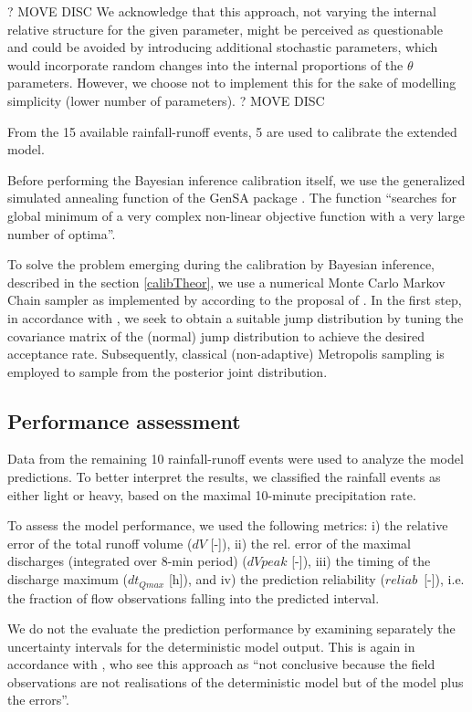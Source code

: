 \documentclass{ctuthesis}\usepackage[]{graphicx}\usepackage[]{color}
\begin{document}
? MOVE DISC
We acknowledge that this approach, not varying the internal relative structure for the given parameter, might be perceived as questionable and could be avoided by introducing additional stochastic parameters, which would incorporate random changes into the internal proportions  of the $\theta$ parameters. However, we choose not to implement this for the sake of modelling simplicity (lower number of parameters).
? MOVE DISC

From the 15 available rainfall-runoff events, 5 are used to calibrate the extended model.

Before performing the  Bayesian inference calibration itself, we use the generalized simulated annealing function of the \textsf{GenSA} package \citep{xiangGeneralizedSimulatedAnnealing2013}. The function \enquote{searches for global minimum of a very complex non-linear objective function with a very large number of optima}.

To solve the problem emerging during the calibration by Bayesian inference, described in the section \ref{calibTheor}, we use a numerical Monte Carlo Markov Chain sampler as implemented by \cite{adaptmcmc} according to the proposal of \cite{vihola2012robust}. In the first step, in accordance with \cite{giudice2013improving}, we seek to obtain a suitable jump distribution by tuning the covariance matrix of the (normal) jump distribution to achieve the desired acceptance rate. Subsequently, classical (non-adaptive) Metropolis sampling is employed to sample from the posterior joint distribution.


\subsection{Performance assessment}

Data from the remaining 10 rainfall-runoff events were used to analyze the model predictions. To better interpret the results, we classified the rainfall events as either light or heavy, based on the maximal 10-minute precipitation rate. 

To assess the model performance, we used the following metrics: i) the relative error of the total runoff volume ($dV$ [-]), ii) the rel. error of the maximal discharges (integrated over 8-min period) ($dVpeak$ [-]), iii) the timing of the discharge maximum ($dt_{Qmax}$ [h]), and iv) the prediction reliability ($reliab$~[-]), i.e. the fraction of flow observations falling into the predicted interval.

We do not the evaluate the prediction performance  by examining separately the uncertainty intervals for the deterministic model output. This is again in accordance with \cite{giudice2013improving}, who see this approach as \enquote{not conclusive because the field observations are not realisations of the deterministic model but of the model plus the errors}.
\end{document}
